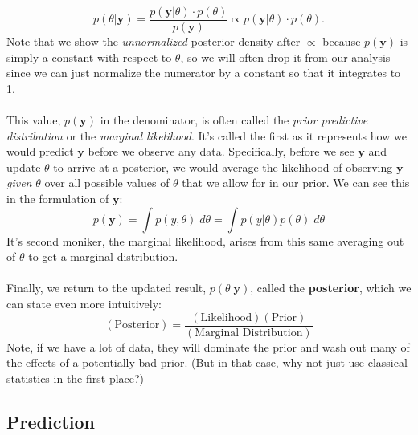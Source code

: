 \documentclass[12pt]{article}
\begin{document}
\begin{equation}
   \label{bayes}
    p(\theta | \mathbf{y}) = \frac{p(\mathbf{y} | \theta) \cdot
      p(\theta)}{p(\mathbf{y})} \propto
      p(\mathbf{y} | \theta) \cdot p(\theta).
\end{equation}
Note that we show the \emph{unnormalized} posterior density after
$\propto$ because $p(\mathbf{y})$ is simply a constant with respect
to $\theta$, so we will often drop it from our analysis
since we can just normalize the numerator by a constant so 
that it integrates to 1.
\\
\\
This value, $p(\mathbf{y})$ in the denominator, is often called 
the \emph{prior predictive distribution} or the \emph{marginal
likelihood}.  It's called the first
as it represents how we would predict $\mathbf{y}$ 
before we observe any data. Specifically, before we see 
$\mathbf{y}$ and update $\theta$ to arrive at a posterior,
we would average the likelihood of observing 
$\mathbf{y}$ \emph{given} $\theta$ over all
possible values of $\theta$ that we allow for in our prior.
We can see this in the formulation of $\mathbf{y}$:
\begin{equation}
    \label{marglik}
    p(\mathbf{y}) = \int p(y, \theta) \; d\theta = 
	\int p(y | \theta) p(\theta) \; d\theta
\end{equation}
It's second moniker,
the marginal likelihood, arises from this same averaging out
of $\theta$ to get a marginal distribution.
\\
\\
Finally, 
we return to the updated result, $p(\theta | \mathbf{y})$,
called the \textbf{posterior}, which we can state  even more
intuitively:
   \[ (\text{Posterior}) = 
      \frac{(\text{Likelihood})(\text{Prior})}{(\text{Marginal 
      Distribution})} \]
Note, if we have a lot of data, they will dominate the prior and
wash out many of the effects of a potentially bad prior. (But in 
that case, why not just use classical statistics in the first place?)

\subsection{Prediction}
\end{document}
